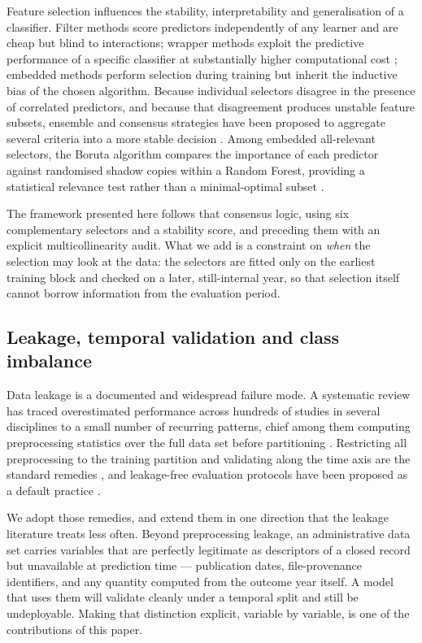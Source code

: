 \documentclass[sn-vancouver,Numbered]{sn-jnl}
\begin{document}
Feature selection influences the stability, interpretability and generalisation of a classifier. Filter methods score predictors independently of any learner and are cheap but blind to interactions; wrapper methods exploit the predictive performance of a specific classifier at substantially higher computational cost \cite{zhou_efficient_2024}; embedded methods perform selection during training but inherit the inductive bias of the chosen algorithm. Because individual selectors disagree in the presence of correlated predictors, and because that disagreement produces unstable feature subsets, ensemble and consensus strategies have been proposed to aggregate several criteria into a more stable decision \cite{zhou_efficient_2024,moslemi_tutorial-based_2023}. Among embedded all-relevant selectors, the Boruta algorithm compares the importance of each predictor against randomised shadow copies within a Random Forest, providing a statistical relevance test rather than a minimal-optimal subset \cite{kursa_feature_2010}.

The framework presented here follows that consensus logic, using six complementary selectors and a stability score, and preceding them with an explicit multicollinearity audit. What we add is a constraint on \emph{when} the selection may look at the data: the selectors are fitted only on the earliest training block and checked on a later, still-internal year, so that selection itself cannot borrow information from the evaluation period.

\subsection{Leakage, temporal validation and class imbalance}

Data leakage is a documented and widespread failure mode. A systematic review has traced overestimated performance across hundreds of studies in several disciplines to a small number of recurring patterns, chief among them computing preprocessing statistics over the full data set before partitioning \cite{kapoor_leakage_2023}. Restricting all preprocessing to the training partition and validating along the time axis are the standard remedies \cite{kapoor_leakage_2023,sasse_leakage_2023}, and leakage-free evaluation protocols have been proposed as a default practice \cite{hamdan_julearn_2023}.

We adopt those remedies, and extend them in one direction that the leakage literature treats less often. Beyond preprocessing leakage, an administrative data set carries variables that are perfectly legitimate as descriptors of a closed record but unavailable at prediction time --- publication dates, file-provenance identifiers, and any quantity computed from the outcome year itself. A model that uses them will validate cleanly under a temporal split and still be undeployable. Making that distinction explicit, variable by variable, is one of the contributions of this paper.
\end{document}
